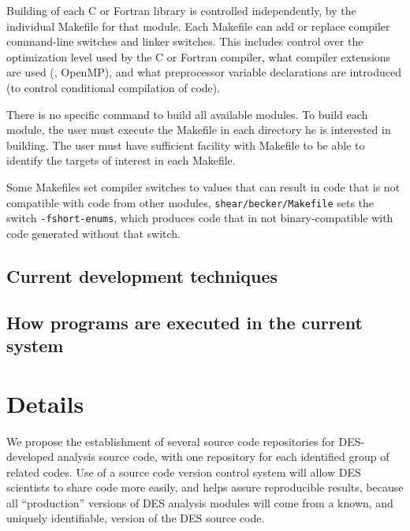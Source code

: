 \documentclass[draftmode,draftwater]{memarticle}
\begin{document}
Building of each C or Fortran library is controlled independently, by the
individual Makefile for that module. Each Makefile can add or replace
compiler command-line switches and linker switches. This includes control over
the optimization level used by the C or Fortran compiler, what compiler
extensions are used (\eg, OpenMP), and what preprocessor variable
declarations are introduced (to control conditional compilation of
code).

There is no specific command to build all available modules. To build
each module, the user must execute the Makefile in each directory he is
interested in building. The user must have sufficient facility with
Makefile to be able to identify the targets of interest in each
Makefile.

Some Makefiles set compiler switches to values that can result in code that
is not compatible with code from other modules, \eg
\texttt{shear/becker/Makefile} sets the switch \texttt{-fshort-enums},
which produces code that in not binary-compatible with code generated
without that switch.
\section{Current development techniques}
\section{How programs are executed in the current system}

\chapter{Details}

We propose the establishment of several source code repositories for
DES-developed analysis source code, with one repository for each
identified group of related codes. Use of a source code version
control system will allow DES scientists to share code more easily,
and helps assure reproducible results, because all ``production''
versions of DES analysis modules will come from a known, and uniquely
identifiable, version of the DES source code.
\end{document}
